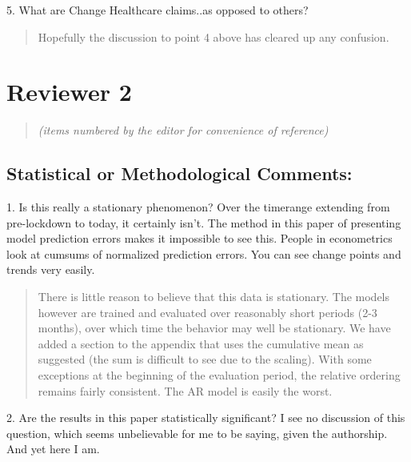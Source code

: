 \documentclass[11pt]{article}
\newenvironment{resp}{\begin{quote}\color{cobalt}}{\end{quote}}
\begin{document}
  5. What are Change Healthcare claims..as opposed to others?


\begin{resp}
  Hopefully the discussion to point 4 above has cleared up any confusion.
\end{resp}


\section*{Reviewer 2}
\begin{quote}
  \emph{(items numbered by the editor for convenience of reference)}
\end{quote}

\subsection*{Statistical or Methodological Comments:}
  
1. Is this really a stationary phenomenon? Over the timerange extending from
pre-lockdown to today, it certainly isn't. The method in this paper of
presenting model prediction errors makes it impossible to see this. People in
econometrics look at cumsums of normalized prediction errors. You can see change
points and trends very easily.

\begin{resp}
  There is little reason to believe that this data is stationary. The models
  however are trained and evaluated over reasonably short periods (2-3 months),
  over which time the behavior may well be stationary. We have added a section
  to the appendix that uses the cumulative mean as suggested (the sum is
  difficult to see due to the scaling). With some exceptions at the beginning of
  the evaluation period, the relative ordering remains fairly consistent. The AR
  model is easily the worst.

\end{resp}

2. Are the results in this paper statistically significant? I see no discussion
of this question, which seems unbelievable for me to be saying, given the
authorship. And yet here I am.
\end{document}
